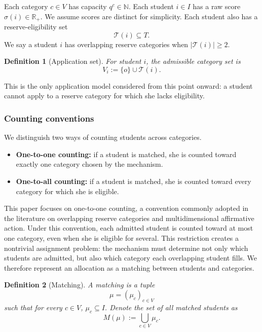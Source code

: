 \documentclass[12pt]{article}
\newtheorem{definition}{Definition}
\newcommand{\T}{\mathcal{T}}
\newcommand{\R}{\mathbb{R}}
\newcommand{\1}{\mathbf{1}}
\begin{document}
Each category $c\in V$ has capacity $q^c\in\mathbb{N}$. Each student $i\in I$ has a raw score $\sigma(i)\in\R_+$. We assume scores are distinct for simplicity. Each student also has a reserve-eligibility set
\[
\T(i)\subseteq T.
\]
We say a student $i$ has overlapping reserve categories when $|\T(i)|\geq 2$.

\begin{definition}[Application set]
For student $i$, the admissible category set is
\[
V_i:=\{o\}\cup\T(i).
\]
\end{definition}

This is the only application model considered from this point onward: a student cannot apply to a reserve category for which she lacks eligibility.

\subsubsection{Counting conventions}

We distinguish two ways of counting students across categories.

\begin{itemize}
\item \textbf{One-to-one counting:} if a student is matched, she is counted toward exactly one category chosen by the mechanism.
\item \textbf{One-to-all counting:} if a student is matched, she is counted toward every category for which she is eligible.
\end{itemize}


This paper focuses on one-to-one counting, a convention commonly adopted in the literature \citep{SoYe22a,AzSu25a} on overlapping reserve categories and multidimensional affirmative action. 
 Under this convention, each admitted student is counted toward at most one category, even when she is eligible for several. This restriction creates a nontrivial assignment problem: the mechanism must determine not only which students are admitted, but also which category each overlapping student fills. We therefore represent an allocation as a matching between students and categories.


\begin{definition}[Matching]
A matching is a tuple
\[
\mu=(\mu_c)_{c\in V}
\]
such that for every $c\in V$, $\mu_c\subseteq I$.
Denote the set of all matched students as
\[
M(\mu):=\bigcup_{c\in V}\mu_c.
\]
\end{definition}
\end{document}
